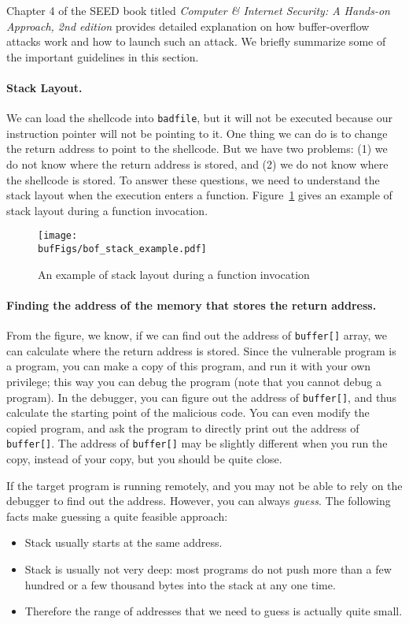 Chapter 4 of the SEED book titled \textit{Computer \& Internet 
Security: A Hands-on Approach, 2nd edition}
provides detailed explanation on how buffer-overflow attacks work and how to 
launch such an attack. We briefly summarize some of the important guidelines
in this section.


\paragraph{Stack Layout.}
We can load the shellcode into \texttt{badfile}, but it will not be executed because our
instruction pointer will not be pointing to it. One thing we can do is to change
the return address to point to the shellcode. But we have two problems:
(1) we do not know where the return address is stored, and
(2) we do not know where the shellcode is stored.
To answer these questions, we need to understand the stack layout when the 
execution enters a function. Figure~\ref{fig:buffer_overflow_stack_example}
gives an example of stack layout during a function invocation.


\begin{figure}[htb]
	\centering
	\texttt{[image: \\bufFigs/bof\_stack\_example.pdf]}
	\caption{An example of stack layout during a function invocation}
	\label{fig:buffer_overflow_stack_example}
\end{figure}


\paragraph{Finding the address of the memory that stores the return address.}
From the figure, we know, if we can find out the address of {\tt buffer[]} array, 
we can calculate where the return address is stored. 
Since the vulnerable program is a \setuid program, you can make a copy of this program,
and run it with your own privilege; this way you can debug the program (note that
you cannot debug a \setuid program). In the debugger, you can figure out
the address of {\tt buffer[]}, and thus calculate the starting point of
the malicious code. You can even modify the copied program, and ask the 
program to directly print out the address of {\tt buffer[]}.
The address of {\tt buffer[]} may be slightly
different when you run the \setuid copy, instead of your copy, but
you should be quite close. 

If the target program is running remotely, and you may not be able to
rely on the debugger to find out the address. However, you can always
{\em guess}. The following facts make guessing a quite feasible approach:
      \begin{itemize}
      \item Stack usually starts at the same address.
      \item Stack is usually not very deep: most programs do not push more than
            a few hundred or a few thousand bytes into the stack at any one time.
      \item Therefore the range of addresses that we need to guess is actually
            quite small.
      \end{itemize}

